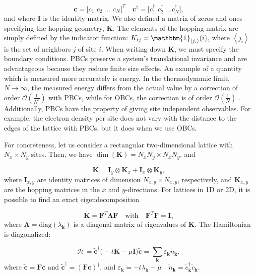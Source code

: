 \begin{equation}
\bm c = \bigg[ c_1 \,\, c_2 \,\, ... \,\, c_N \bigg]^T \quad \bm c^\dagger = \bigg[c_1^\dagger \,\, c_2^\dagger \,\, ... c_N^\dagger \bigg] ,
\end{equation}
and where $\bm I$ is the identity matrix.
We also defined a matrix of zeros and ones specifying the hopping geometry, $\bm K$. The elements of the hopping matrix are simply defined by the indicator function: $K_{ij} = \mathbbm{1}_{\left\langle j_i \right\rangle} (i)$, where $\left\langle j_i \right\rangle$ is the set of neighbors $j$ of site $i$.
When writing down $\bm K$, we must specify the boundary conditions.
\acp{PBC} preserve a system's translational invariance and are advantageous because they reduce finite size effects.
An example of a quantity which is measured more accurately is energy.
In the thermodynamic limit, $N \rightarrow \infty$, the measured energy differs from the actual value by a correction of order $\mathcal{O}(\frac{1}{N^2})$ with \acp{PBC}, while for \acp{OBC}, the correction is of order $\mathcal{O}(\frac{1}{N})$ \cite{hou_numerical_2009}.
Additionally, \acp{PBC} have the property of giving site independent observables.
For example, the electron density per site does not vary with the distance to the edges of the lattice with \acp{PBC}, but it does when we use \acp{OBC}.

For concreteness, let us consider a rectangular two-dimensional lattice with $N_x \times N_y$ sites. Then, we have $\dim(\bm K) = N_x N_y \times N_x N_y $, and

\begin{equation}
\bm K = \bm I_y \otimes \bm K_x + \bm I_x \otimes \bm K_y ,
\end{equation}
where $\bm I_{x, y}$ are identity matrices of dimension $N_{x, y} \times N_{x, y}$, respectively, and $\bm K_{x, y}$ are the hopping matrices in the $x$ and $y$-directions.
For lattices in \acs{1D} or \acs{2D}, it is possible to find an exact eigendecomposition

\begin{equation}
\bm K = \bm F^T \bm \Lambda \bm F \quad \text{with}  \quad \bm F^T \bm F = \bm I ,
\end{equation}
where $\bm \Lambda = \text{diag}(\lambda_{\bm k})$ is a diagonal matrix of eigenvalues of $\bm K$.
The Hamiltonian is diagonalized:

\begin{equation}\label{eq:quadraticH}
\mathcal{H} =\tilde{\bm c}^\dagger \big( -t \bm K - \mu \bm I \big) \tilde{\bm c} = \sum_{\bm k} \varepsilon_{\bm k} \tilde{n}_{\bm k} ,
\end{equation}
where $\tilde{\bm c} = \bm F \bm c$ and $\tilde{\bm c}^\dagger = (\bm F \bm c)^\dagger$, and $
\varepsilon_{\bm k} = -t \lambda_{\bm k} - \mu \quad \tilde{n}_{\bm k} = \tilde{c}_{\bm k}^\dagger \tilde{c}_{\bm k}
$.

